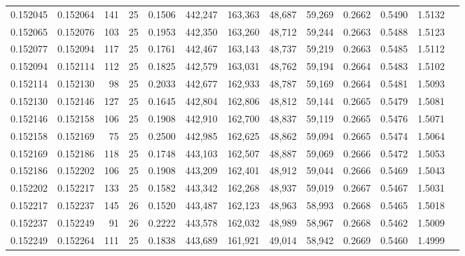 \begin{tabular}{rrrrrrrrrrrrr}
0.152045 & 0.152064 &   141 &  25 &                                     0.1506 & 442,247 & 163,363 &  48,687 &  59,269 & 0.2662 & 0.5490 & 1.5132 \\
0.152065 & 0.152076 &   103 &  25 &                                     0.1953 & 442,350 & 163,260 &  48,712 &  59,244 & 0.2663 & 0.5488 & 1.5123 \\
0.152077 & 0.152094 &   117 &  25 &                                     0.1761 & 442,467 & 163,143 &  48,737 &  59,219 & 0.2663 & 0.5485 & 1.5112 \\
0.152094 & 0.152114 &   112 &  25 &                                     0.1825 & 442,579 & 163,031 &  48,762 &  59,194 & 0.2664 & 0.5483 & 1.5102 \\
0.152114 & 0.152130 &    98 &  25 &                                     0.2033 & 442,677 & 162,933 &  48,787 &  59,169 & 0.2664 & 0.5481 & 1.5093 \\
0.152130 & 0.152146 &   127 &  25 &                                     0.1645 & 442,804 & 162,806 &  48,812 &  59,144 & 0.2665 & 0.5479 & 1.5081 \\
0.152146 & 0.152158 &   106 &  25 &                                     0.1908 & 442,910 & 162,700 &  48,837 &  59,119 & 0.2665 & 0.5476 & 1.5071 \\
0.152158 & 0.152169 &    75 &  25 &                                     0.2500 & 442,985 & 162,625 &  48,862 &  59,094 & 0.2665 & 0.5474 & 1.5064 \\
0.152169 & 0.152186 &   118 &  25 &                                     0.1748 & 443,103 & 162,507 &  48,887 &  59,069 & 0.2666 & 0.5472 & 1.5053 \\
0.152186 & 0.152202 &   106 &  25 &                                     0.1908 & 443,209 & 162,401 &  48,912 &  59,044 & 0.2666 & 0.5469 & 1.5043 \\
0.152202 & 0.152217 &   133 &  25 &                                     0.1582 & 443,342 & 162,268 &  48,937 &  59,019 & 0.2667 & 0.5467 & 1.5031 \\
0.152217 & 0.152237 &   145 &  26 &                                     0.1520 & 443,487 & 162,123 &  48,963 &  58,993 & 0.2668 & 0.5465 & 1.5018 \\
0.152237 & 0.152249 &    91 &  26 &                                     0.2222 & 443,578 & 162,032 &  48,989 &  58,967 & 0.2668 & 0.5462 & 1.5009 \\
0.152249 & 0.152264 &   111 &  25 &                                     0.1838 & 443,689 & 161,921 &  49,014 &  58,942 & 0.2669 & 0.5460 & 1.4999 \\

\end{tabular}
